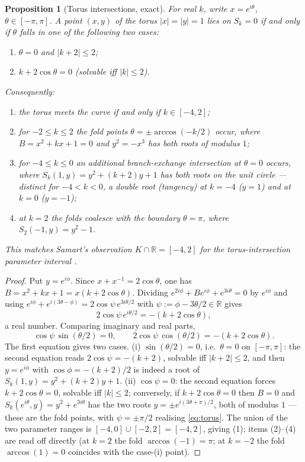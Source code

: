 \documentclass[11pt]{amsart}
\newtheorem{proposition}[theorem]{Proposition}
\theoremstyle{definition}
\theoremstyle{remark}
\newcommand{\R}{\mathbb{R}}
\begin{document}
\begin{proposition}[Torus intersections, exact]\label{prop:torus}
For \emph{real} $k$, write $x=e^{i\theta}$, $\theta\in[-\pi,\pi]$. A point
$(x,y)$ of the torus $|x|=|y|=1$ lies on $S_k=0$ if and only if $\theta$
falls in one of the following two cases:
\begin{enumerate}
  \item[\textup{(i)}] $\theta=0$ and $|k+2|\le2$;
  \item[\textup{(ii)}] $k+2\cos\theta=0$ \textup{(}solvable iff
  $|k|\le2$\textup{)}.
\end{enumerate}
Consequently:
\begin{enumerate}
  \item the torus meets the curve if and only if $k\in[-4,2]$;
  \item for $-2\le k\le2$ the \emph{fold points}
  $\theta=\pm\arccos(-k/2)$ occur, where $B=x^2+kx+1=0$ and $y^2=-x^3$ has
  both roots of modulus $1$;
  \item for $-4\le k\le0$ an additional \emph{branch-exchange intersection}
  at $\theta=0$ occurs, where $S_k(1,y)=y^2+(k+2)y+1$ has both roots on the
  unit circle --- distinct for $-4<k<0$, a double root (tangency) at $k=-4$
  ($y=1$) and at $k=0$ ($y=-1$);
  \item at $k=2$ the folds coalesce with the boundary $\theta=\pi$, where
  $S_2(-1,y)=y^2-1$.
\end{enumerate}
This matches Samart's observation $K\cap\R=[-4,2]$ for the
torus-intersection parameter interval \cite{Samart2023}.
\end{proposition}

\begin{proof}
Put $y=e^{i\phi}$. Since $x+x^{-1}=2\cos\theta$, one has
$B=x^2+kx+1=x(k+2\cos\theta)$. Dividing
$e^{2i\phi}+Be^{i\phi}+e^{3i\theta}=0$ by $e^{i\phi}$ and using
$e^{i\phi}+e^{i(3\theta-\phi)}=2\cos\psi\,e^{3i\theta/2}$ with
$\psi:=\phi-3\theta/2\in\R$ gives
\begin{equation}\label{eq:torus}
  2\cos\psi\,e^{i\theta/2}=-(k+2\cos\theta),
\end{equation}
a real number. Comparing imaginary and real parts,
\[
  \cos\psi\,\sin(\theta/2)=0,
  \qquad
  2\cos\psi\,\cos(\theta/2)=-(k+2\cos\theta).
\]
The first equation gives two cases. (i) $\sin(\theta/2)=0$, i.e.\
$\theta=0$ on $[-\pi,\pi]$: the second equation reads
$2\cos\psi=-(k+2)$, solvable iff $|k+2|\le2$, and then
$y=e^{i\phi}$ with $\cos\phi=-(k+2)/2$ is indeed a root of
$S_k(1,y)=y^2+(k+2)y+1$. (ii) $\cos\psi=0$: the second equation forces
$k+2\cos\theta=0$, solvable iff $|k|\le2$; conversely, if
$k+2\cos\theta=0$ then $B=0$ and $S_k(e^{i\theta},y)=y^2+e^{3i\theta}$
has the two roots $y=\pm e^{i(3\theta+\pi)/2}$, both of modulus $1$ ---
these are the fold points, with $\psi=\pm\pi/2$ realising
\eqref{eq:torus}. The union of the two parameter ranges is
$[-4,0]\cup[-2,2]=[-4,2]$, giving (1); items (2)--(4) are read off
directly (at $k=2$ the fold $\arccos(-1)=\pi$; at $k=-2$ the fold
$\arccos(1)=0$ coincides with the case-(i) point).
\end{proof}
\end{document}
